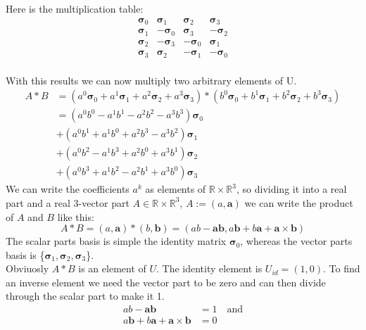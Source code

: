 \documentclass[11pt]{article}
\begin{document}
Here is the multiplication table:
\begin{equation}
    \begin{matrix}
        \bm{\sigma}_0 &  \bm{\sigma}_1 &  \bm{\sigma}_2 &  \bm{\sigma}_3 \\
        \bm{\sigma}_1 & -\bm{\sigma}_0 &  \bm{\sigma}_3 & -\bm{\sigma}_2 \\
        \bm{\sigma}_2 & -\bm{\sigma}_3 & -\bm{\sigma}_0 &  \bm{\sigma}_1 \\
        \bm{\sigma}_3 &  \bm{\sigma}_2 & -\bm{\sigma}_1 & -\bm{\sigma}_0 \\
    \end{matrix}
\end{equation}
    
With this results we can now multiply two arbitrary elements of U.
\begin{equation}
    \begin{aligned}
        A * B &= (a^0\bm{\sigma}_0 + a^1\bm{\sigma}_1 + a^2\bm{\sigma}_2 + a^3\bm{\sigma}_3)
        * (b^0\bm{\sigma}_0 + b^1\bm{\sigma}_1 + b^2\bm{\sigma}_2 + b^3\bm{\sigma}_3) \\
        &=(a^0b^0 - a^1b^1 - a^2b^2 - a^3b^3)\bm{\sigma}_0 \\
        &+(a^0b^1 + a^1b^0 + a^2b^3 - a^3b^2)\bm{\sigma}_1 \\
        &+(a^0b^2 - a^1b^3 + a^2b^0 + a^3b^1)\bm{\sigma}_2 \\
        &+(a^0b^3 + a^1b^2 - a^2b^1 + a^3b^0)\mathbf{\bm{\sigma}}_3
    \end{aligned}
\end{equation}
We can write the coefficients $a^k$ as elements of $\mathbb{R} \times \mathbb{R}^3$,
so dividing it into a real part and a real 3-vector part 
$A \in \mathbb{R} \times \mathbb{R}^3, \, A := (a, \mathbf{a})$ we can write
the product of $A$ and $B$ like this:
\begin{equation}\label{eq:"QuatMult"}
    A*B=(a, \mathbf{a})*(b, \mathbf{b})
    =(ab-\mathbf{a}\mathbf{b}, a\mathbf{b}+b\mathbf{a}+\mathbf{a}\times\mathbf{b})
\end{equation}
The scalar parts basis is simple the identity matrix $\bm{\sigma}_0$, whereas the vector 
parts basis is \{$\bm{\sigma}_1, \bm{\sigma}_2, \bm{\sigma}_3$\}.\\
Obviuosly $A*B$ is an element of $U$. The identity element is $U_{id}=(1, 0)$. To find
an inverse element we need the vector part to be zero and can then divide through the
scalar part to make it 1.
\begin{subequations}
    \begin{align}
        ab-\mathbf{a}\mathbf{b} &= 1 \quad \text{and}\\
        a\mathbf{b}+b\mathbf{a}+\mathbf{a}\times\mathbf{b} &= 0
    \end{align}
\end{subequations}
\end{document}
